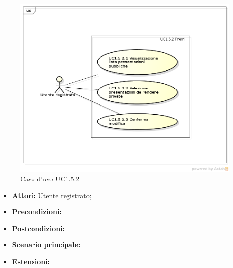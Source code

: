 \begin{figure}[h]
	\begin{center}
	\includegraphics[scale=0.4]{diagram/UC1-5-2.png}
	\caption{Caso d'uso UC1.5.2}
	\end{center}
\end{figure}

\begin{itemize}
	\item \textbf{Attori:} Utente registrato;
	\item \textbf{Precondizioni:}
	\item \textbf{Postcondizioni:}
	\item \textbf{Scenario principale:}
	\item \textbf{Estensioni:}
\end{itemize}